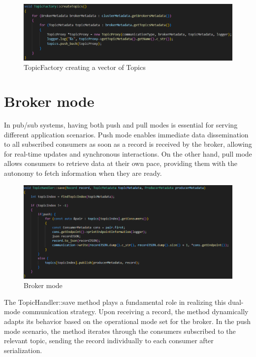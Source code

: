 \begin{figure}[H]
    \centering
    \includegraphics[width=1.0\textwidth]{Figures/implementation_topic_factory.png}
    \caption{TopicFactory creating a vector of Topics}
\end{figure}

\section{Broker mode}

In pub/sub systems, having both push and pull modes is essential
for serving different application scenarios. Push mode enables immediate
data dissemination to all subscribed consumers as soon as a record is received
by the broker, allowing for real-time updates and synchronous interactions.
On the other hand, pull mode allows consumers to retrieve data at their own
pace, providing them with the autonomy to fetch information when they are ready.

\begin{figure}[H]
    \centering
    \includegraphics[width=1.0\textwidth]{Figures/implementation_broker_mode.png}
    \caption{Broker mode}
\end{figure}

The TopicHandler::save method plays a fundamental role in realizing this dual-mode
communication strategy. Upon receiving a record, the method dynamically adapts
its behavior based on the operational mode set for the broker.
In the push mode scenario, the method iterates through the consumers subscribed
to the relevant topic, sending the record individually to each consumer after
serialization.

